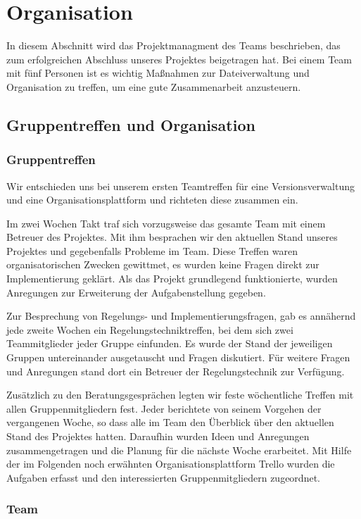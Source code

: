 \chapter{Organisation}
\label{cha:Organisation}
In diesem Abschnitt wird das Projektmanagment des Teams beschrieben, das zum erfolgreichen Abschluss unseres Projektes beigetragen hat. Bei einem Team mit fünf Personen ist es wichtig Maßnahmen zur Dateiverwaltung und Organisation zu treffen, um eine gute Zusammenarbeit anzusteuern.

\section{Gruppentreffen und Organisation}
\label{sec:gruppentreffenundorganisation}
\subsection*{Gruppentreffen}
Wir entschieden uns bei unserem ersten Teamtreffen für eine Versionsverwaltung und eine Organisationsplattform und richteten diese zusammen ein.

Im zwei Wochen Takt traf sich vorzugsweise das gesamte Team mit einem Betreuer des Projektes. Mit ihm besprachen wir den aktuellen Stand unseres Projektes und gegebenfalls Probleme im Team. Diese Treffen waren organisatorischen Zwecken gewittmet, es wurden keine Fragen direkt zur Implementierung geklärt. Als das Projekt grundlegend funktionierte, wurden Anregungen zur Erweiterung der Aufgabenstellung gegeben. 

Zur Besprechung von Regelungs- und Implementierungsfragen, gab es annähernd jede zweite Wochen ein Regelungstechniktreffen, bei dem sich zwei Teammitglieder jeder Gruppe einfunden. Es wurde der Stand der jeweiligen Gruppen untereinander ausgetauscht und Fragen diskutiert. Für weitere Fragen und Anregungen stand dort ein Betreuer der Regelungstechnik zur Verfügung.

Zusätzlich zu den Beratungsgesprächen legten wir feste wöchentliche Treffen mit allen Gruppenmitgliedern fest. Jeder berichtete von seinem Vorgehen der vergangenen Woche, so dass alle im Team den Überblick über den aktuellen Stand des Projektes hatten. Daraufhin wurden Ideen und Anregungen zusammengetragen und die Planung für die nächste Woche erarbeitet. Mit Hilfe der im Folgenden noch erwähnten Organisationsplattform Trello wurden die Aufgaben erfasst und den interessierten Gruppenmitgliedern zugeordnet. 

\subsection*{Team}

